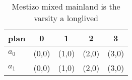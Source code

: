 \documentclass[a4paper]{article}
\begin{document}
\begin{table}
\begin{adjustbox}{width=0.7\columnwidth}
\begin{tabular}{|l|l|l|l|l|}
\hline
\textbf{plan} & \multicolumn{1}{c|}{\textbf{0}} & \multicolumn{1}{c|}{\textbf{1}} & \multicolumn{1}{c|}{\textbf{2}} & \multicolumn{1}{c|}{\textbf{3}} \\ \hline
\textbf{$a_0$}  & (0,0) & (1,0) & (2,0) & (3,0) \\ \hline
\textbf{$a_1$}  & (0,0) & (1,0) & (2,0) & (3,0) \\ \hline
\end{tabular}
\end{adjustbox}
\caption{Mestizo mixed mainland is the varsity a longlived
}
\end{table}
\end{document}
